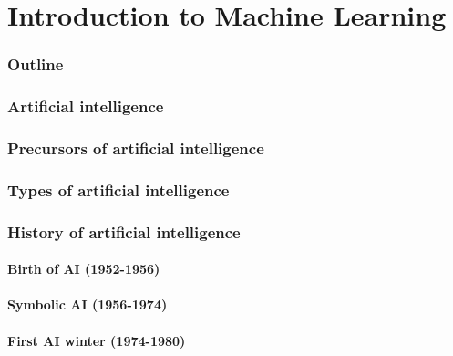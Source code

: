 \renewcommand{\prevpart}{0 }
\renewcommand{\thispart}{1 }
\renewcommand{\nextpart}{2 }
\renewcommand{\thispartname}{Introduction to Machine Learning}

\part{\thispartname}



\section{Outline}


\section{Artificial intelligence}


\section{Precursors of artificial intelligence}


\section{Types of artificial intelligence}





\section{History of artificial intelligence}

\subsection{Birth of AI (1952-1956)}







\subsection{Symbolic AI (1956-1974)}
\subsection{First AI winter (1974-1980)}
